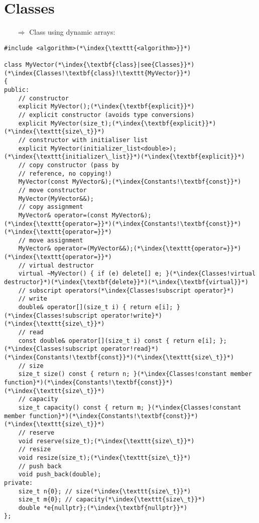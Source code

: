 \documentclass[10pt]{article}
\begin{document}
\section{Classes}
\small
\begin{enumerate}
\item[$\Rightarrow$] Class using dynamic arrays:
\end{enumerate}
\begin{lstlisting}
#include <algorithm>(*\index{\texttt{<algorithm>}}*)

class MyVector(*\index{\textbf{class}|see{Classes}}*)(*\index{Classes!\textbf{class}!\texttt{MyVector}}*)
{
public:
    // constructor
    explicit MyVector();(*\index{\textbf{explicit}}*)
    // explicit constructor (avoids type conversions)
    explicit MyVector(size_t);(*\index{\textbf{explicit}}*)(*\index{\texttt{size\_t}}*)
    // constructor with initialiser list
    explicit MyVector(initializer_list<double>);(*\index{\texttt{initializer\_list}}*)(*\index{\textbf{explicit}}*)
    // copy constructor (pass by
    // reference, no copying!)
    MyVector(const MyVector&);(*\index{Constants!\textbf{const}}*)
    // move constructor
    MyVector(MyVector&&);
    // copy assignment
    MyVector& operator=(const MyVector&);(*\index{\texttt{operator=}}*)(*\index{Constants!\textbf{const}}*)(*\index{\texttt{operator=}}*)
    // move assignment
    MyVector& operator=(MyVector&&);(*\index{\texttt{operator=}}*)(*\index{\texttt{operator=}}*)
    // virtual destructor
    virtual ~MyVector() { if (e) delete[] e; }(*\index{Classes!virtual destructor}*)(*\index{\textbf{delete}}*)(*\index{\textbf{virtual}}*)
    // subscript operators(*\index{Classes!subscript operator}*)
    // write
    double& operator[](size_t i) { return e[i]; }(*\index{Classes!subscript operator!write}*)(*\index{\texttt{size\_t}}*)
    // read
    const double& operator[](size_t i) const { return e[i]; };(*\index{Classes!subscript operator!read}*)(*\index{Constants!\textbf{const}}*)(*\index{\texttt{size\_t}}*)
    // size
    size_t size() const { return n; }(*\index{Classes!constant member function}*)(*\index{Constants!\textbf{const}}*)(*\index{\texttt{size\_t}}*)
    // capacity
    size_t capacity() const { return m; }(*\index{Classes!constant member function}*)(*\index{Constants!\textbf{const}}*)(*\index{\texttt{size\_t}}*)
    // reserve
    void reserve(size_t);(*\index{\texttt{size\_t}}*)
    // resize
    void resize(size_t);(*\index{\texttt{size\_t}}*)
    // push back
    void push_back(double);
private:
    size_t n{0}; // size(*\index{\texttt{size\_t}}*)
    size_t m{0}; // capacity(*\index{\texttt{size\_t}}*)
    double *e{nullptr};(*\index{\textbf{nullptr}}*)
};
\end{lstlisting}
\end{document}
